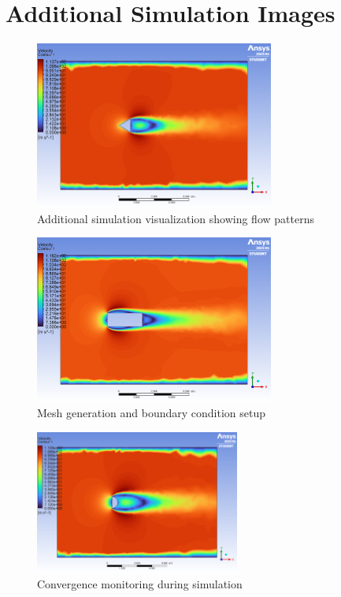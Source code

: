 \documentclass[12pt,a4paper]{article}
\begin{document}
\newpage
\appendix
\section{Additional Simulation Images}

\begin{figure}[H]
    \centering
    \includegraphics[width=0.7\textwidth]{image3.png}
    \caption{Additional simulation visualization showing flow patterns}
    \label{fig:sim1}
\end{figure}

\begin{figure}[H]
    \centering
    \includegraphics[width=0.7\textwidth]{image10.png}
    \caption{Mesh generation and boundary condition setup}
    \label{fig:sim2}
\end{figure}

\begin{figure}[H]
    \centering
    \includegraphics[width=0.6\textwidth]{image16.png}
    \caption{Convergence monitoring during simulation}
    \label{fig:sim3}
\end{figure}
\end{document}
